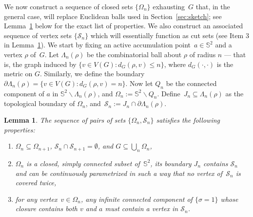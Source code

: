 \documentclass[11pt,letterpaper]{amsart}
\newcounter{n}
\numberwithin{n}{section}
\theoremstyle{plain}
\newtheorem{lemma}[n]{Lemma}
\theoremstyle{definition}
\theoremstyle{remark}
\renewcommand\setminus\smallsetminus
\newcommand\bbS{\mathbb S}
\newcommand\calS{\mathcal S}
\newcommand\domain\Omega
\newcommand{\1}{\mathbbm{1}}
\begin{document}
We now construct a sequence of closed sets $\{\domain_n\}$ exhausting~$G$ that, in the general case, will replace Euclidean balls used in Section~\ref{sec:sketch}; see Lemma~\ref{lem:jordan-domains} below for the exact list of properties. We also construct an associated sequence of vertex sets $\{\calS_n\}$ which will essentially function as cut sets (see Item 3 in Lemma~\ref{lem:jordan-domains}).
We start by fixing an active accumulation point~$a\in\bbS^2$ and a vertex $\rho$ of~$G$. 
Let $\Lambda_n(\rho)$ be the combinatorial ball about $\rho$ of radius $n$ --- that is, the graph induced by $\{v \in V(G): d_G(\rho,v) \leq n\}$, where $d_G(\cdot,\cdot)$ is the metric on $G$. Similarly, we define the boundary $\partial \Lambda_n(\rho) = \{v \in V(G): d_G(\rho,v) = n\}$. Now let $Q_n$ be the connected component of $a$ in $\bbS^2 \setminus \Lambda_n(\rho)$, and $\domain_n := \bbS^2 \setminus Q_n$.
Define~$J_n\subseteq \Lambda_n(\rho)$ as the topological boundary of $\domain_n$, and~$\calS_n := J_n \cap \partial \Lambda_n(\rho)$.

\begin{lemma}\label{lem:jordan-domains}
	The sequence of pairs of sets $\{\domain_n, \calS_n\}$ satisfies the following properties:
	\begin{enumerate}
	\item $\domain_n \subseteq \domain_{n+1}$, $\calS_n\cap \calS_{n+1} = \emptyset$, and $G \subseteq \bigcup_{n} \domain_n$,
 	\item $\domain_n$ is a closed, simply connected subset of~$\bbS^2$,  its boundary $J_n$ contains $\calS_n$ and can be continuously parametrized in such a way that no vertex of~$\calS_n$ is covered twice,
	\item for any vertex~$v \in \Omega_n$, any infinite connected component of $\{\sigma=1\}$ whose closure contains both $v$ and $a$ must contain a vertex in $\calS_n$.
\end{enumerate}
\end{lemma}  
\end{document}

